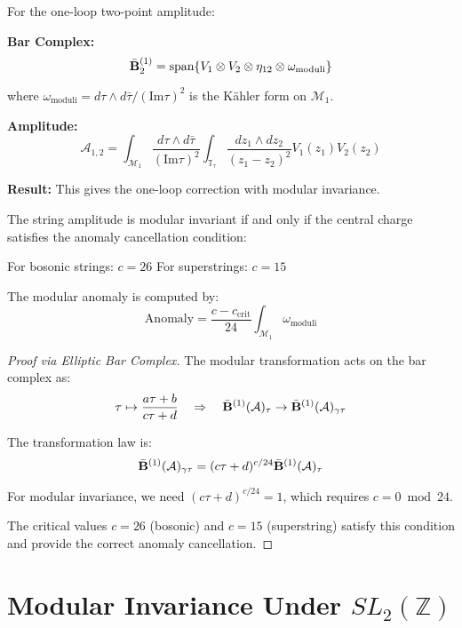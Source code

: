 \begin{example}
For the one-loop two-point amplitude:

\textbf{Bar Complex:}
$$\bar{\mathbf{B}}^{(1)}_2 = \text{span}\{V_1 \otimes V_2 \otimes \eta_{12} \otimes \omega_{\text{moduli}}\}$$

where $\omega_{\text{moduli}} = d\tau \wedge d\bar{\tau}/(\text{Im}\tau)^2$ is the Kähler form on $\mathcal{M}_1$.

\textbf{Amplitude:}
$$\mathcal{A}_{1,2} = \int_{\mathcal{M}_1} \frac{d\tau \wedge d\bar{\tau}}{(\text{Im}\tau)^2} \int_{\mathbb{T}_\tau} \frac{dz_1 \wedge dz_2}{(z_1-z_2)^2} V_1(z_1) V_2(z_2)$$

\textbf{Result:} This gives the one-loop correction with modular invariance.
\end{example}

\begin{theorem}\label{thm:modular-anomaly}
The string amplitude is modular invariant if and only if the central charge satisfies the anomaly cancellation condition:

For bosonic strings: $c = 26$
For superstrings: $c = 15$

The modular anomaly is computed by:
$$\text{Anomaly} = \frac{c - c_{\text{crit}}}{24} \int_{\mathcal{M}_1} \omega_{\text{moduli}}$$
\end{theorem}

\begin{proof}[Proof via Elliptic Bar Complex]
The modular transformation acts on the bar complex as:
$$\tau \mapsto \frac{a\tau + b}{c\tau + d} \quad \Rightarrow \quad \bar{\mathbf{B}}^{(1)}(\mathcal{A})_\tau \to \bar{\mathbf{B}}^{(1)}(\mathcal{A})_{\gamma\tau}$$

The transformation law is:
$$\bar{\mathbf{B}}^{(1)}(\mathcal{A})_{\gamma\tau} = (c\tau + d)^{c/24} \bar{\mathbf{B}}^{(1)}(\mathcal{A})_\tau$$

For modular invariance, we need $(c\tau + d)^{c/24} = 1$, which requires $c = 0 \bmod 24$.

The critical values $c = 26$ (bosonic) and $c = 15$ (superstring) satisfy this condition and provide the correct anomaly cancellation.
\end{proof}

\section{Modular Invariance Under $SL_2(\mathbb{Z})$}

